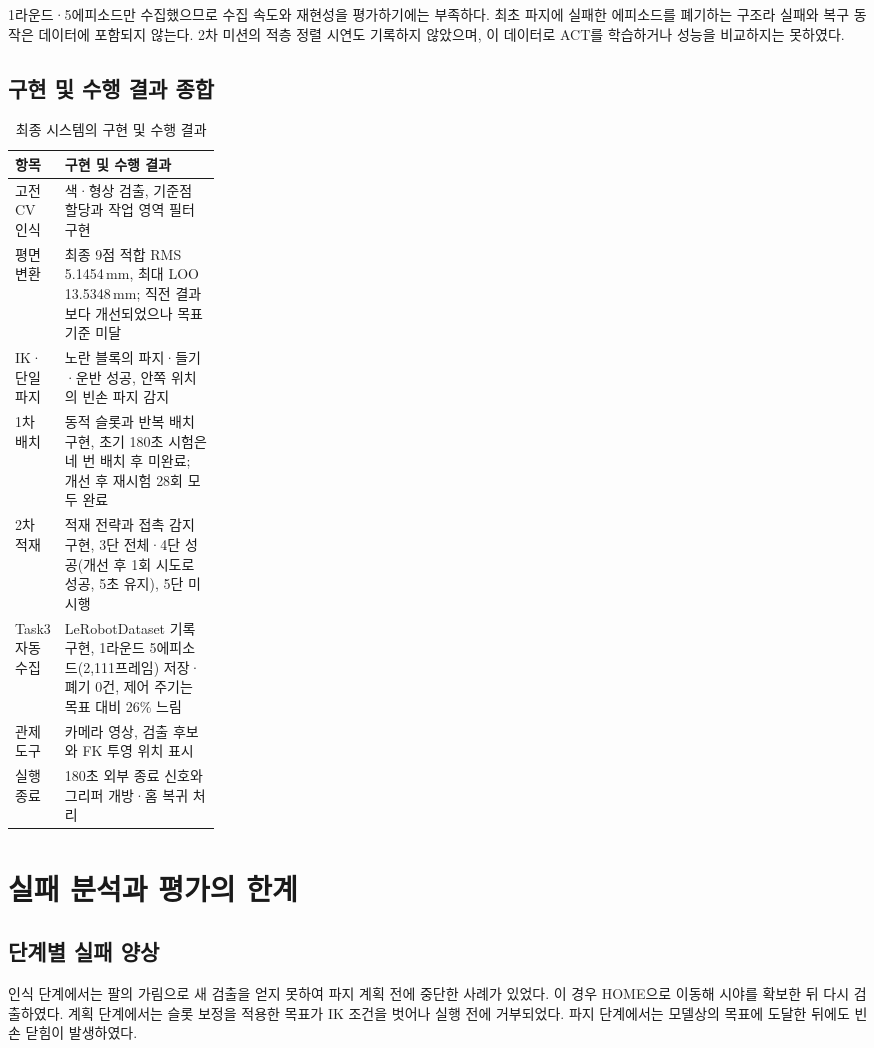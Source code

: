 1라운드·5에피소드만 수집했으므로 수집 속도와 재현성을 평가하기에는 부족하다. 최초 파지에 실패한 에피소드를 폐기하는 구조라 실패와 복구 동작은 데이터에 포함되지 않는다. 2차 미션의 적층 정렬 시연도 기록하지 않았으며, 이 데이터로 ACT를 학습하거나 성능을 비교하지는 못하였다.

\subsection{구현 및 수행 결과 종합}
\begin{table}[!htbp]
\centering
\caption{최종 시스템의 구현 및 수행 결과}\label{tab:status}
\begin{tabularx}{\linewidth}{@{}L{0.24\linewidth}Y@{}}
\toprule 항목 & 구현 및 수행 결과 \\\midrule
고전 CV 인식 & 색·형상 검출, 기준점 할당과 작업 영역 필터 구현 \\
평면 변환 & 최종 9점 적합 RMS 5.1454\,mm, 최대 LOO 13.5348\,mm; 직전 결과보다 개선되었으나 목표 기준 미달 \\
IK·단일 파지 & 노란 블록의 파지·들기·운반 성공, 안쪽 위치의 빈손 파지 감지 \\
1차 배치 & 동적 슬롯과 반복 배치 구현, 초기 180초 시험은 네 번 배치 후 미완료; 개선 후 재시험 28회 모두 완료 \\
2차 적재 & 적재 전략과 접촉 감지 구현, 3단 전체·4단 성공(개선 후 1회 시도로 성공, 5초 유지), 5단 미시행 \\
Task3 자동 수집 & LeRobotDataset 기록 구현, 1라운드 5에피소드(2{,}111프레임) 저장·폐기 0건, 제어 주기는 목표 대비 26\% 느림 \\
관제 도구 & 카메라 영상, 검출 후보와 FK 투영 위치 표시 \\
실행 종료 & 180초 외부 종료 신호와 그리퍼 개방·홈 복귀 처리 \\
\bottomrule
\end{tabularx}
\end{table}
\FloatBarrier

\section{실패 분석과 평가의 한계}
\subsection{단계별 실패 양상}
인식 단계에서는 팔의 가림으로 새 검출을 얻지 못하여 파지 계획 전에 중단한 사례가 있었다. 이 경우 HOME으로 이동해 시야를 확보한 뒤 다시 검출하였다. 계획 단계에서는 슬롯 보정을 적용한 목표가 IK 조건을 벗어나 실행 전에 거부되었다. 파지 단계에서는 모델상의 목표에 도달한 뒤에도 빈손 닫힘이 발생하였다.

